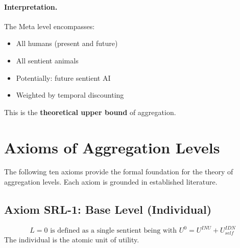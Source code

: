\paragraph{Interpretation.}
The Meta level encompasses:
\begin{itemize}
\item All humans (present and future)
\item All sentient animals
\item Potentially: future sentient AI
\item Weighted by temporal discounting
\end{itemize}

This is the \textbf{theoretical upper bound} of aggregation.


\section{Axioms of Aggregation Levels}
\label{sec:aaa-axioms}

The following ten axioms provide the formal foundation for the theory of 
aggregation levels. Each axiom is grounded in established literature.

\subsection{Axiom SRL-1: Base Level (Individual)}

\begin{tcolorbox}[colback=gray!5!white, colframe=gray!75!black, title=Axiom SRL-1: Base Level]
\begin{equation}
\boxed{
L = 0 \text{ is defined as a single sentient being with } U^0 = U^{INU} + U^{IDN}_{self}
}
\end{equation}
The individual is the atomic unit of utility.
\end{tcolorbox}


